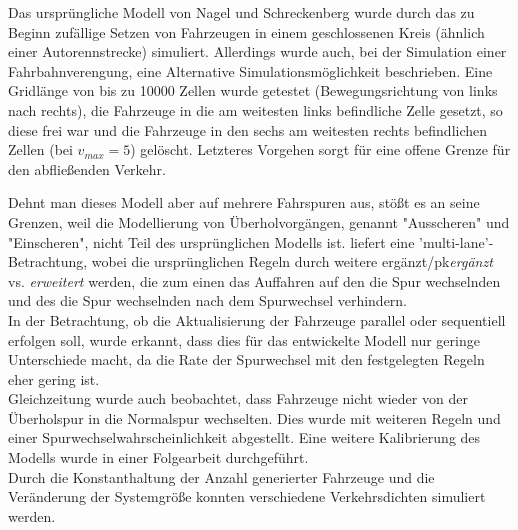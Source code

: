 Das ursprüngliche Modell von Nagel und Schreckenberg wurde durch das zu Beginn zufällige Setzen von Fahrzeugen in einem geschlossenen Kreis (ähnlich einer Autorennstrecke) simuliert. Allerdings wurde auch, bei der Simulation einer Fahrbahnverengung, eine Alternative Simulationsmöglichkeit beschrieben. Eine Gridlänge von bis zu 10000 Zellen wurde getestet (Bewegungsrichtung von links nach rechts), die Fahrzeuge in die am weitesten links befindliche Zelle gesetzt, so diese frei war und die Fahrzeuge in den sechs am weitesten rechts befindlichen Zellen (bei $v_{max}=5$) gelöscht. Letzteres Vorgehen sorgt für eine offene Grenze für den abfließenden Verkehr.

Dehnt man dieses Modell aber auf mehrere Fahrspuren aus, stößt es an seine Grenzen, weil die Modellierung von Überholvorgängen, genannt "Ausscheren" und "Einscheren", nicht Teil des ursprünglichen Modells ist. \cite{multi-lane} liefert eine 'multi-lane'-Betrachtung, wobei die ursprünglichen Regeln durch weitere ergänzt/pk{\textit{ergänzt} vs. \textit{erweitert}} werden, die zum einen das Auffahren auf den die Spur wechselnden und des die Spur wechselnden nach dem Spurwechsel verhindern. \\
In der Betrachtung, ob die Aktualisierung der Fahrzeuge parallel oder sequentiell erfolgen soll, wurde erkannt, dass dies für das entwickelte Modell nur geringe Unterschiede macht, da die Rate der Spurwechsel mit den festgelegten Regeln eher gering ist. \\
Gleichzeitung wurde auch beobachtet, dass Fahrzeuge nicht wieder von der Überholspur in die Normalspur wechselten. Dies wurde mit weiteren Regeln und einer Spurwechselwahrscheinlichkeit abgestellt. Eine weitere Kalibrierung des Modells wurde in einer Folgearbeit durchgeführt. \\
Durch die Konstanthaltung der Anzahl generierter Fahrzeuge und die Veränderung der Systemgröße konnten verschiedene Verkehrsdichten simuliert werden. 

